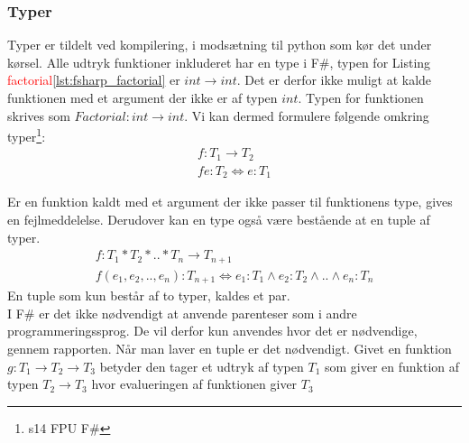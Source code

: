 

\subsubsection{Typer}
Typer er tildelt ved kompilering, i modsætning til python som kør det under kørsel. Alle udtryk funktioner inkluderet har en type i F\#, typen for Listing \textcolor{red}{factorial}\ref{lst:fsharp_factorial} er $int \rightarrow int$. Det er derfor ikke muligt at kalde funktionen med et argument der ikke er af typen $int$. Typen for funktionen skrives som $Factorial: int \rightarrow int$. Vi kan dermed formulere følgende omkring typer\footnote{s14 FPU F\#}: 
\begin{gather*}
    f: T_1 \rightarrow T_2 \\
    f e : T_2 \iff e : T_1
\end{gather*}

Er en funktion kaldt med et argument der ikke passer til funktionens type, gives en fejlmeddelelse. Derudover kan en type også være bestående at en tuple af typer.
\begin{gather*}
    f: T_1 * T_2 * .. * T_n \rightarrow T_{n+1}\\
    f (e_1, e_2, .., e_n) :T_{n+1} \iff e_1 : T_1 \land e_2 : T_2 \land .. \land e_n : T_n
\end{gather*}
En tuple som kun består af to typer, kaldes et par. \\I F\# er det ikke nødvendigt at anvende parenteser som i andre programmeringssprog. De vil derfor kun anvendes hvor det er nødvendige, gennem rapporten. Når man laver en tuple er det nødvendigt.
Givet en funktion $g: T_1 \rightarrow T_2 \rightarrow T_3$ betyder den tager et udtryk af typen $T_1$ som giver en funktion af typen $T_2 \rightarrow T_3$ hvor evalueringen af funktionen giver $T_3$
 
